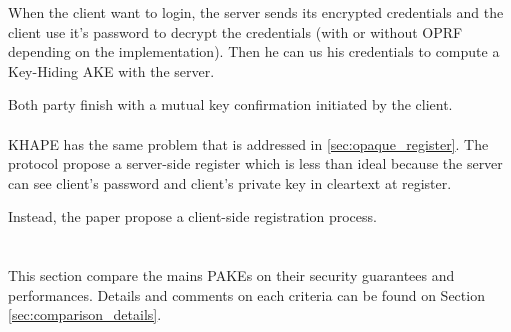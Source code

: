 \documentclass[../report.tex]{subfiles}
\begin{document}
When the client want to login, the server sends its encrypted credentials and the client use it's password to decrypt the credentials (with or without OPRF depending on the implementation). Then he can us his credentials to compute a Key-Hiding AKE with the server.

Both party finish with a mutual key confirmation initiated by the client.


\paragraph{}
KHAPE has the same problem that is addressed in \ref{sec:opaque_register}.
The protocol propose a server-side register which is less than ideal because the server can see client's password and client's private key in cleartext at register.

Instead, the paper propose a client-side registration process.






\section{}

This section compare the mains PAKEs on their security guarantees and performances. Details and comments on each criteria can be found on Section \ref{sec:comparison_details}.
\end{document}
